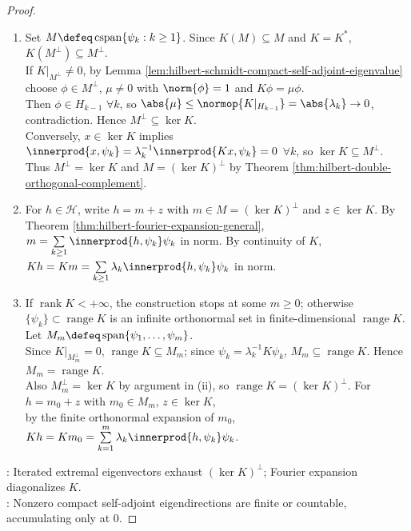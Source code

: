 \begin{theorem}
\begin{proof}
\begin{enumerate}[label=(\roman*)]
If $\operatorname{rank}K=+\infty$, it cannot stop, since $K|_{H_m}=0$ implies $\operatorname{range}K\subseteq M_m$.\\
If $\lambda_k\not\to0$, then for some $\varepsilon>0$, $\norm{K\psi_j-K\psi_k}^2=\lambda_j^2+\lambda_k^2\geq2\varepsilon^2$ for infinitely many $j\neq k$, contradiction.
\item Set $M\defeq\operatorname{cspan}\{\psi_k:k\geq1\}$. Since $K(M)\subseteq M$ and $K=K^*$, $K(M^\perp)\subseteq M^\perp$.\\
If $K|_{M^\perp}\neq0$, by Lemma \ref{lem:hilbert-schmidt-compact-self-adjoint-eigenvalue} choose $\phi\in M^\perp$, $\mu\neq0$ with $\norm{\phi}=1$ and $K\phi=\mu\phi$.\\
Then $\phi\in H_{k-1}$ $\forall k$, so $\abs{\mu}\leq\normop{K|_{H_{k-1}}}=\abs{\lambda_k}\to0$, contradiction. Hence $M^\perp\subseteq\ker K$.\\
Conversely, $x\in\ker K$ implies $\innerprod{x,\psi_k}=\lambda_k^{-1}\innerprod{Kx,\psi_k}=0$ $\forall k$, so $\ker K\subseteq M^\perp$.\\
Thus $M^\perp=\ker K$ and $M=(\ker K)^\perp$ by Theorem \ref{thm:hilbert-double-orthogonal-complement}.
\item For $h\in\mathcal H$, write $h=m+z$ with $m\in M=(\ker K)^\perp$ and $z\in\ker K$. By Theorem \ref{thm:hilbert-fourier-expansion-general},\\
$m=\sum\limits_{k\geq1}\innerprod{h,\psi_k}\psi_k$ in norm. By continuity of $K$, $Kh=Km=\sum\limits_{k\geq1}\lambda_k\innerprod{h,\psi_k}\psi_k$ in norm.
\item If $\operatorname{rank}K<+\infty$, the construction stops at some $m\geq0$; otherwise $\{\psi_k\}\subset\operatorname{range}K$ is an infinite orthonormal set in finite-dimensional $\operatorname{range}K$. Let $M_m\defeq\operatorname{span}\{\psi_1,\ldots,\psi_m\}$.\\
Since $K|_{M_m^\perp}=0$, $\operatorname{range}K\subseteq M_m$; since $\psi_k=\lambda_k^{-1}K\psi_k$, $M_m\subseteq\operatorname{range}K$. Hence $M_m=\operatorname{range}K$.\\
Also $M_m^\perp=\ker K$ by argument in (ii), so $\operatorname{range}K=(\ker K)^\perp$. For $h=m_0+z$ with $m_0\in M_m$, $z\in\ker K$,\\
by the finite orthonormal expansion of $m_0$, $Kh=Km_0=\sum\limits_{k=1}^m\lambda_k\innerprod{h,\psi_k}\psi_k$.
\end{enumerate}
: Iterated extremal eigenvectors exhaust $(\ker K)^\perp$; Fourier expansion diagonalizes $K$.\\
: Nonzero compact self-adjoint eigendirections are finite or countable, accumulating only at $0$.
\end{proof}
\end{theorem}

